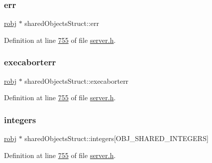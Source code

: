 \mbox{\label{structsharedObjectsStruct_a3456409013b8cc19acd7d5a1cac9c1ed}} 
\subsubsection{\texorpdfstring{err}{err}}
{\footnotesize\ttfamily \hyperlink{structredisObject}{robj} $\ast$ shared\+Objects\+Struct\+::err}



Definition at line \hyperlink{server_8h_source_l00755}{755} of file \hyperlink{server_8h_source}{server.\+h}.

\mbox{\label{structsharedObjectsStruct_a434b44fe9c1342d575d91bd3028c470f}} 
\subsubsection{\texorpdfstring{execaborterr}{execaborterr}}
{\footnotesize\ttfamily \hyperlink{structredisObject}{robj} $\ast$ shared\+Objects\+Struct\+::execaborterr}



Definition at line \hyperlink{server_8h_source_l00755}{755} of file \hyperlink{server_8h_source}{server.\+h}.

\mbox{\label{structsharedObjectsStruct_a75f1d6deb59a196ed6a5a7e272687c60}} 
\subsubsection{\texorpdfstring{integers}{integers}}
{\footnotesize\ttfamily \hyperlink{structredisObject}{robj} $\ast$ shared\+Objects\+Struct\+::integers\mbox{[}O\+B\+J\+\_\+\+S\+H\+A\+R\+E\+D\+\_\+\+I\+N\+T\+E\+G\+E\+RS\mbox{]}}



Definition at line \hyperlink{server_8h_source_l00755}{755} of file \hyperlink{server_8h_source}{server.\+h}.

